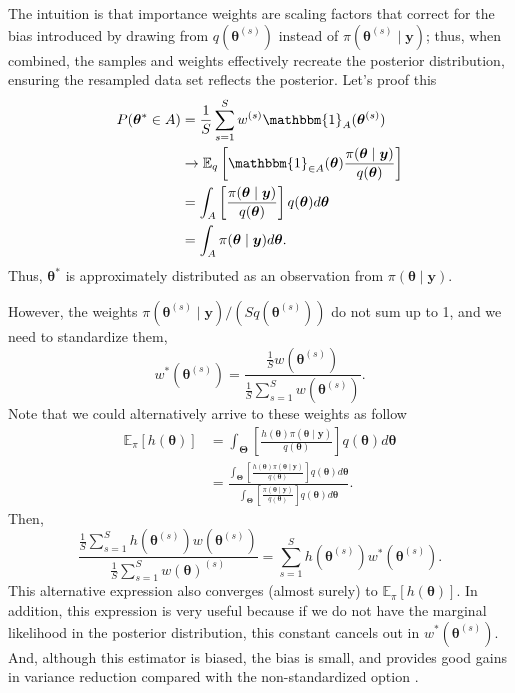 The intuition is that importance weights are scaling factors that correct for the bias introduced by drawing from $q(\bm{\theta}^{(s)})$ instead of $\pi(\bm{\theta}^{(s)}\mid \bm{y})$; thus, when combined, the samples and weights effectively recreate the posterior distribution, ensuring the resampled data set reflects the posterior. Let's proof this 
\begin{align*}
	P(\bm{\theta}^*\in A)
	&=\frac{1}{S}\sum_{s=1}^S{w}^{(s)}\mathbbm{1}_{A}(\bm{\theta}^{(s)})\\
	&\rightarrow \mathbb{E}_q\left[\mathbbm{1}_{\in A}(\bm{\theta})\frac{\pi(\bm{\theta}\mid \bm{y})}{q(\bm{\theta})}\right]\\
	&=\int_{A}\left[\frac{\pi(\bm{\theta}\mid \bm{y})}{q(\bm{\theta})}\right]q(\bm{\theta})d\bm{\theta}\\
	&=\int_{A}\pi(\bm{\theta}\mid \bm{y})d\bm{\theta}. 
\end{align*}
Thus, $\bm{\theta}^*$ is approximately distributed as an observation from $\pi(\bm{\theta}\mid \bm{y})$.   


However, the weights $\pi(\bm{\theta}^{(s)}\mid \bm{y})/(Sq(\bm{\theta}^{(s)}))$ do not sum up to 1, and we need to standardize them, 
$$w^*(\bm{\theta}^{(s)})=\frac{\frac{1}{S} w(\bm{\theta}^{(s)})}{\frac{1}{S}\sum_{s=1}^Sw(\bm{\theta}^{(s)})}.$$
Note that we could alternatively arrive to these weights as follow 
\begin{align*}\label{eq5_4}
	\mathbb{E}_{\pi}[h(\bm{\theta})]&=\int_{\bm{\Theta}} \left[\frac{h(\bm{\theta}) \pi(\bm{\theta}\mid \bm{y})}{q(\bm{\theta})}\right]q(\bm{\theta})d\bm{\theta}\\
	&=\frac{\int_{\bm{\Theta}}\left[\frac{h(\bm{\theta}) \pi(\bm{\theta}\mid \bm{y})}{q(\bm{\theta})}\right] q(\bm{\theta})d\bm{\theta}}{\int_{\bm{\Theta}}\left[\frac{ \pi(\bm{\theta}\mid \bm{y})}{q(\bm{\theta})}\right] q(\bm{\theta})d\bm{\theta}}.
\end{align*}
Then, $$\frac{\frac{1}{S}\sum_{s=1}^Sh(\bm{\theta}^{(s)})w(\bm{\theta}^{(s)})}{\frac{1}{S}\sum_{s=1}^Sw(\bm{\theta})^{(s)}}= \sum_{s=1}^S h(\bm{\theta}^{(s)})w^*(\bm{\theta}^{(s)}).$$ This alternative expression also converges (almost surely) to $\mathbb{E}_{\pi}[h(\bm{\theta})]$.  In addition, this expression is very useful because if we do not have the marginal likelihood in the posterior distribution, this constant cancels out in $w^*(\bm{\theta}^{(s)})$. And, although this estimator is biased, the bias is small, and provides good gains in variance reduction compared with the non-standardized option \cite[Chap.~3]{robert2011monte}.

